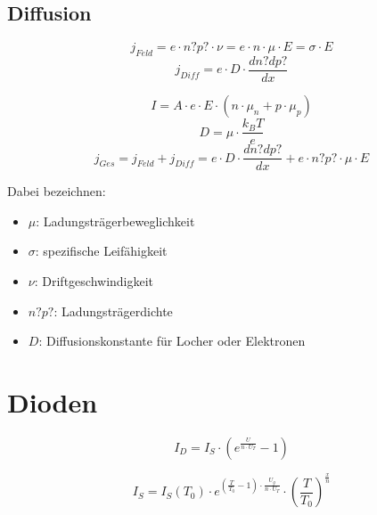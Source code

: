 \documentclass{article}
\begin{document}
\subsection*{Diffusion}
\begin{minipage}[t]{0.451\textwidth}
    \begin{equation*}
        j_{Feld}=e\cdot n?p?\cdot \nu=e\cdot n\cdot \mu\cdot E=\sigma\cdot E
    \end{equation*}
    \begin{equation*}
        j_{Diff} = e\cdot D\cdot \frac{dn?dp?}{dx}
    \end{equation*}
\end{minipage}
\begin{minipage}[t]{0.49\textwidth}
    \begin{equation*}
        I=A\cdot e\cdot E\cdot (n\cdot\mu_n+p\cdot\mu_p)
    \end{equation*}
    \begin{equation*}
        D=\mu\cdot\frac{k_BT}{e}
    \end{equation*}
    \begin{equation*}
        j_{Ges} = j_{Feld}+j_{Diff}=e\cdot D\cdot\frac{dn?dp?}{dx}+e\cdot n?p?\cdot\mu\cdot E
    \end{equation*}
\end{minipage}
Dabei bezeichnen:
\begin{multicols}{3}
\begin{itemize}
    \item $\mu$: Ladungsträgerbeweglichkeit
    \item $\sigma$: spezifische Leifähigkeit
    \item $\nu$: Driftgeschwindigkeit
    \item $n?p?$: Ladungsträgerdichte
    \item $D$: Diffusionskonstante für Locher oder Elektronen
\end{itemize}
\end{multicols}

\section*{Dioden}
\begin{minipage}[t]{0.4\textwidth}
\begin{equation*}
    I_D = I_S \cdot (e^{\frac{U}{n \cdot U_T}} - 1)
\end{equation*}
\end{minipage}
\begin{minipage}[t]{0.5\textwidth}
\begin{equation*}
    I_S = I_S(T_0)\cdot e^{(\frac{T}{T_0}-1)\cdot \frac{U_g}{n\cdot U_T}}\cdot (\frac{T}{T_0})^{\frac{x}{n}}
\end{equation*}
\end{minipage}
\end{document}

